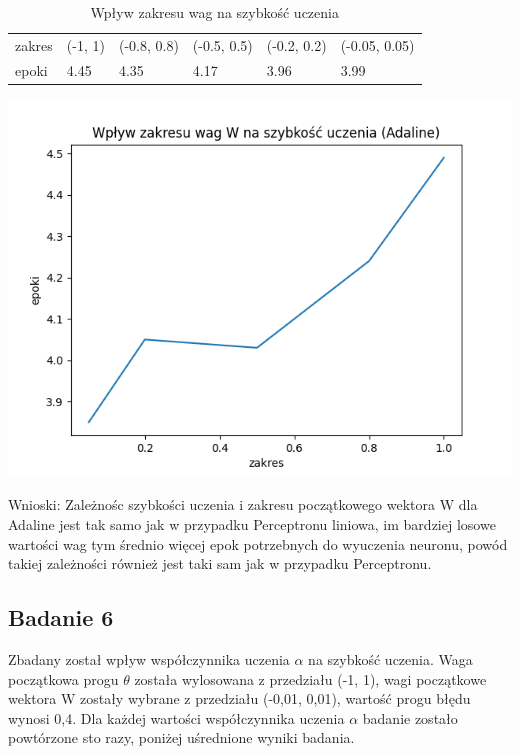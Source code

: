 \documentclass{article}
\begin{document}
\begin{table}[h]
  \centering
  \caption{Wpływ zakresu wag na szybkość uczenia}
  \begin{tabular}{llllll}
    \toprule
    zakres & (-1, 1) & (-0.8, 0.8) & (-0.5, 0.5) & (-0.2, 0.2) & (-0.05, 0.05) \\
    epoki & 4.45 & 4.35 & 4.17 & 3.96 & 3.99 \\
    \bottomrule
  \end{tabular}
\end{table}


\begin{center}
\includegraphics[scale=0.8]{ada_exp1.png}
\end{center}

Wnioski: Zależnośc szybkości uczenia i zakresu początkowego wektora W dla Adaline jest tak samo jak w przypadku Perceptronu liniowa, im bardziej losowe wartości wag tym średnio więcej epok potrzebnych do wyuczenia neuronu, powód takiej zależności również jest taki sam jak w przypadku Perceptronu.

\newpage
\subsection{Badanie 6}

Zbadany został wpływ współczynnika uczenia $\alpha$ na szybkość uczenia. Waga początkowa progu $\theta$ została wylosowana z przedziału (-1, 1), wagi początkowe wektora W zostały wybrane z przedziału (-0,01, 0,01), wartość progu błędu wynosi 0,4. Dla każdej wartości współczynnika uczenia $\alpha$ badanie zostało powtórzone sto razy, poniżej uśrednione wyniki badania.\\
\end{document}
